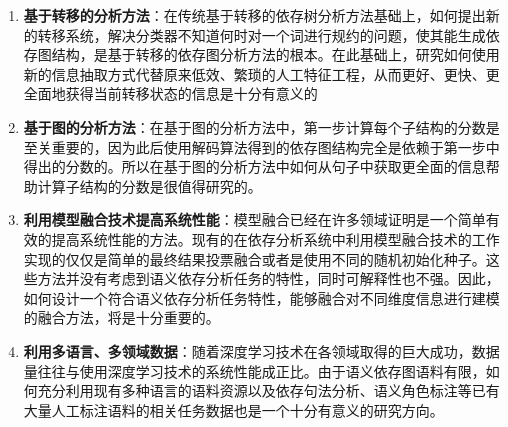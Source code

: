\begin{enumerate}
	\item \textbf{基于转移的分析方法}：在传统基于转移的依存树分析方法基础上，如何提出新的转移系统，解决分类器不知道何时对一个词进行规约的问题，使其能生成依存图结构，是基于转移的依存图分析方法的根本。在此基础上，研究如何使用新的信息抽取方式代替原来低效、繁琐的人工特征工程，从而更好、更快、更全面地获得当前转移状态的信息是十分有意义的
	
	\item \textbf{基于图的分析方法}：在基于图的分析方法中，第一步计算每个子结构的分数是至关重要的，因为此后使用解码算法得到的依存图结构完全是依赖于第一步中得出的分数的。所以在基于图的分析方法中如何从句子中获取更全面的信息帮助计算子结构的分数是很值得研究的。
	
	\item \textbf{利用模型融合技术提高系统性能}：模型融合已经在许多领域证明是一个简单有效的提高系统性能的方法。现有的在依存分析系统中利用模型融合技术的工作实现的仅仅是简单的最终结果投票融合或者是使用不同的随机初始化种子。这些方法并没有考虑到语义依存分析任务的特性，同时可解释性也不强。因此，如何设计一个符合语义依存分析任务特性，能够融合对不同维度信息进行建模的融合方法，将是十分重要的。
	
	\item \textbf{利用多语言、多领域数据}：随着深度学习技术在各领域取得的巨大成功，数据量往往与使用深度学习技术的系统性能成正比。由于语义依存图语料有限，如何充分利用现有多种语言的语料资源以及依存句法分析、语义角色标注等已有大量人工标注语料的相关任务数据也是一个十分有意义的研究方向。
	
\end{enumerate}




